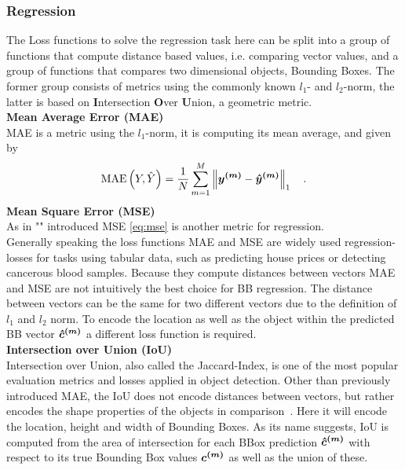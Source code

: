 \subsubsection{Regression}\label{subsubsec:regression-loss}
The Loss functions to solve the regression task here can be split into a group of functions that compute distance based values, i.e. comparing vector values, and a group of functions that compares two dimensional objects, Bounding Boxes.
The former group consists of metrics using the commonly known $l_1$- and $l_2$-norm, the latter is based on  \textbf{I}ntersection \textbf{O}ver \textbf{U}nion, a geometric metric.\\
\textbf{Mean Average Error (MAE)}\\
MAE is a metric using the $l_1$-norm, it is computing its mean average, and given by
\begin{align}
    \text{MAE}\left(Y, \hat{Y}\right) = \frac{1}{N}
    \sum \limits_{m=1}^M
    \left\lVert\bm{y^{(m)}} - \bm{\hat{y}^{(m)}}\right\rVert_1\quad .
    \label{mae}
\end{align}
\textbf{Mean Square Error (MSE)}\\
As in "" introduced MSE \eqref{eq:mse} is another metric for regression.\\\newline
Generally speaking the loss functions MAE and MSE are widely used regression-losses for tasks using tabular data, such as predicting house prices or detecting cancerous blood samples.
Because they compute distances between vectors MAE and MSE are not intuitively the best choice for BB regression.
The distance between vectors can be the same for two different vectors due to the definition of $l_1$ and $l_2$ norm.
To encode the location as well as the object within the predicted BB vector $\bm{\hat{c}^{(m)}}$ a different loss function is required.
\\
\textbf{Intersection over Union (IoU)}\\
Intersection over Union, also called the Jaccard-Index, is one of the most popular evaluation metrics and losses applied in object detection. Other than previously introduced MAE, the IoU does not encode distances between vectors, but rather encodes the shape properties of the objects in comparison~\cite{GIoU}. Here it will encode the location, height and width of Bounding Boxes.
As its name suggests, IoU is computed from the area of intersection for each BBox prediction $\bm{\hat{c}^{(m)}}$ with respect to its true Bounding Box values $\bm{c^{(m)}}$ as well as the union of these.
